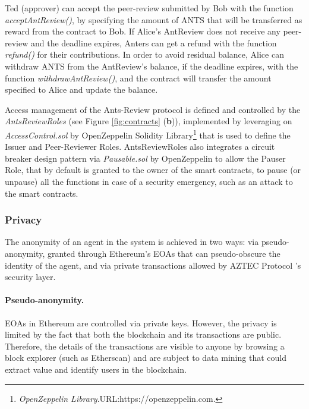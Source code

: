 \documentclass[runningheads]{llncs}
\begin{document}
 \newline Ted (approver) can accept the peer-review submitted by Bob with the function \emph{acceptAntReview()}, by specifying the amount of ANTS that will be transferred as reward from the contract to Bob.
If Alice's AntReview does not receive any peer-review and the deadline expires, Anters can get a refund with the function \emph{refund()} for their contributions. In order to avoid residual balance, Alice can withdraw ANTS from the AntReview's balance, if the deadline expires, with the function \emph{withdrawAntReview()}, and the contract will transfer the amount specified to Alice and update the balance.

Access management of the Ants-Review protocol is defined and controlled by the \emph{AntsReviewRoles} (see Figure \ref{fig:contracts} (\textbf{b})), implemented by leveraging on \emph{AccessControl.sol} by OpenZeppelin Solidity Library\footnote[10]{\emph{OpenZeppelin Library}.\textsc{URL:}https://openzeppelin.com.} that is used to define the Issuer and Peer-Reviewer Roles. AntsReviewRoles also integrates a circuit breaker design pattern via \emph{Pausable.sol} by OpenZeppelin to allow the Pauser Role, that by default is granted to the owner of the smart contracts, to pause (or unpause) all the functions in case of a security emergency, such as an attack to the smart contracts.

\subsubsection{Privacy}
The anonymity of an agent in the system is achieved in two ways: via pseudo-anonymity, granted through Ethereum's EOAs that can pseudo-obscure the identity of the agent, and via private transactions allowed by AZTEC Protocol \cite{AZTEC}'s security layer.

\paragraph{\textbf{Pseudo-anonymity}.}EOAs in Ethereum are controlled via private keys. However, the privacy is limited by the fact that both the blockchain and its transactions are public.  Therefore, the details of the transactions are visible to anyone by browsing a block explorer (such as Etherscan) and are subject to data mining that could extract value and identify users in the blockchain.
\end{document}
